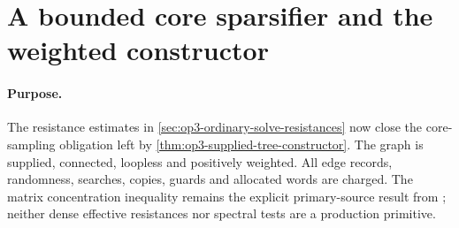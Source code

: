 \section{A bounded core sparsifier and the weighted constructor}
\label{sec:op3-bounded-core-sparsifier}

\paragraph{Purpose.}
The resistance estimates in \cref{sec:op3-ordinary-solve-resistances}
now close the core-sampling obligation left by
\cref{thm:op3-supplied-tree-constructor}. The graph is supplied,
connected, loopless and positively weighted. All edge records, randomness,
searches, copies, guards and allocated words are charged. The matrix
concentration inequality remains the explicit primary-source result from
\citet[Corollary 5.2, PDF p.~29]{tropp2012tails}; neither dense effective
resistances nor spectral tests are a production primitive.

